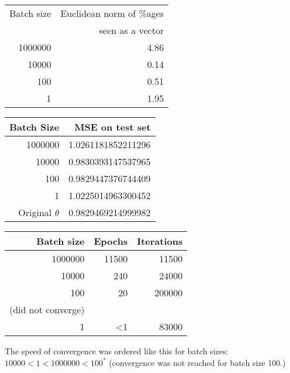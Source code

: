 \documentclass[11pt]{article}
\begin{document}
\begin{center}
\begin{tabular}{rr}
\hline
Batch size & Euclidean
norm of \%ages\\
	&seen as a vector \\
\hline
1000000 & 4.86\\
10000 & 0.14\\
100 & 0.51\\
1 & 1.95\\
\hline
\end{tabular}
\end{center}

\begin{center}
\begin{tabular}{rr}
Batch Size & MSE on test set\\
\hline
1000000 & 1.0261181852211296\\
10000 & 0.9830393147537965\\
100 & 0.9829447376744409\\
1 & 1.0225014963300452\\
Original \(\theta\) & 0.9829469214999982\\
\end{tabular}
\end{center}

\begin{center}
\begin{tabular}{rrr}
\hline
Batch size & Epochs & Iterations\\
\hline
1000000 & 11500 & 11500\\
\hline
10000 & 240 & 24000\\
\hline
100 & 20 & 200000\\
(did not converge) &  & \\
\hline
1 & <1 & 83000\\
\hline
\end{tabular}
\end{center}

The speed of convergence was ordered like this for batch sizes:
\(10000<1<1000000<100^*\) (convergence was not reached for batch size 100.)
\end{document}
